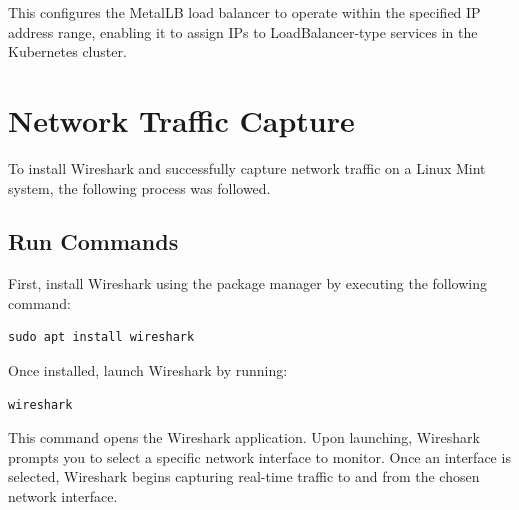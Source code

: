 This configures the MetalLB load balancer to operate within the specified IP address range, enabling it to assign IPs to LoadBalancer-type services in the Kubernetes cluster.




\section{Network Traffic Capture}
To install Wireshark and successfully capture network traffic on a Linux Mint system, the following process was followed.

\subsection{Run Commands}
First, install Wireshark using the package manager by executing the following command:

\begin{lstlisting}[breaklines=true,basicstyle=\small\ttfamily,frame=single]
sudo apt install wireshark
\end{lstlisting}

Once installed, launch Wireshark by running:

\begin{lstlisting}[breaklines=true,basicstyle=\small\ttfamily,frame=single]
wireshark
\end{lstlisting}

This command opens the Wireshark application. Upon launching, Wireshark prompts you to select a specific network interface to monitor. Once an interface is selected, Wireshark begins capturing real-time traffic to and from the chosen network interface.



